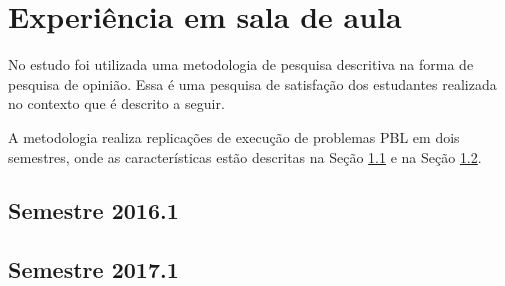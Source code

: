 \section{Experiência em sala de aula}
\label{sec-experiencia}

No estudo foi utilizada uma metodologia de pesquisa descritiva na forma
de pesquisa de opinião.
Essa é uma pesquisa de satisfação dos estudantes
realizada no contexto que é descrito a seguir.

A metodologia realiza replicações de execução de problemas
PBL em dois semestres, onde as características
estão descritas na Seção \ref{sec-exp-2016} e na Seção \ref{sec-exp-2017}.



\subsection{Semestre 2016.1}
\label{sec-exp-2016}

\subsection{Semestre 2017.1}
\label{sec-exp-2017}
